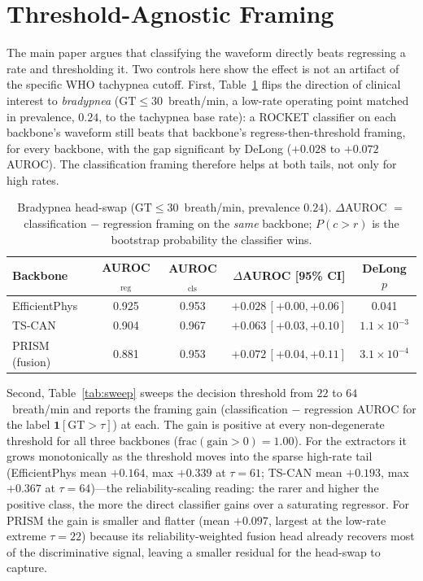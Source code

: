 \section{Threshold-Agnostic Framing}
\label{app:framing}
The main paper argues that classifying the waveform directly beats regressing a rate and thresholding it.
Two controls here show the effect is not an artifact of the specific WHO tachypnea cutoff. First,
Table~\ref{tab:brady} flips the direction of clinical interest to \emph{bradypnea} ($\text{GT}\le
30$~breath/min, a low-rate operating point matched in prevalence, $0.24$, to the tachypnea base rate): a
ROCKET classifier on each backbone's waveform still beats that backbone's regress-then-threshold framing,
for every backbone, with the gap significant by DeLong ($+0.028$ to $+0.072$ AUROC). The classification
framing therefore helps at both tails, not only for high rates.

\begin{table}[!t]
\caption{Bradypnea head-swap ($\text{GT}\le 30$~breath/min, prevalence $0.24$). $\Delta$AUROC $=$
classification $-$ regression framing on the \emph{same} backbone; $P(c{>}r)$ is the bootstrap probability
the classifier wins.}
\label{tab:brady}\centering\small
\begin{tabular}{@{}lcccc@{}}\toprule
Backbone & AUROC$_\text{reg}$ & AUROC$_\text{cls}$ & $\Delta$AUROC [95\% CI] & DeLong $p$\\\midrule
EfficientPhys   & 0.925 & 0.953 & $+0.028\,[{+}0.00,{+}0.06]$ & 0.041\\
TS-CAN          & 0.904 & 0.967 & $+0.063\,[{+}0.03,{+}0.10]$ & $1.1{\times}10^{-3}$\\
PRISM (fusion)  & 0.881 & 0.953 & $+0.072\,[{+}0.04,{+}0.11]$ & $3.1{\times}10^{-4}$\\\bottomrule
\end{tabular}
\end{table}

Second, Table~\ref{tab:sweep} sweeps the decision threshold from $22$ to $64$~breath/min and reports the
framing gain (classification $-$ regression AUROC for the label $\mathbf{1}[\text{GT}>\tau]$) at each. The
gain is positive at every non-degenerate threshold for all three backbones ($\text{frac}(\text{gain}{>}0)=
1.00$). For the extractors it grows monotonically as the threshold moves into the sparse high-rate tail
(EfficientPhys mean $+0.164$, max $+0.339$ at $\tau{=}61$; TS-CAN mean $+0.193$, max $+0.367$ at
$\tau{=}64$)---the reliability-scaling reading: the rarer and higher the positive class, the more the
direct classifier gains over a saturating regressor. For PRISM the gain is smaller and flatter (mean
$+0.097$, largest at the low-rate extreme $\tau{=}22$) because its reliability-weighted fusion head already
recovers most of the discriminative signal, leaving a smaller residual for the head-swap to capture.

